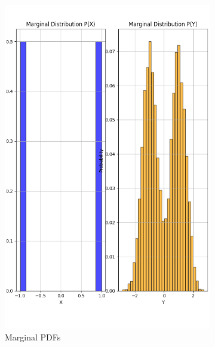 \documentclass{article}
\begin{document}
\begin{figure}[H]
  \centering
  \begin{subfigure}{0.45\textwidth}
    \centering
    \includegraphics[width=\linewidth]{results/section2/e(1).png}
    \caption{Marginal PDFs}
  \end{subfigure}
  \hfill
  \begin{subfigure}{0.45\textwidth}
    \centering

\end{subfigure}
\end{figure}
\end{document}
